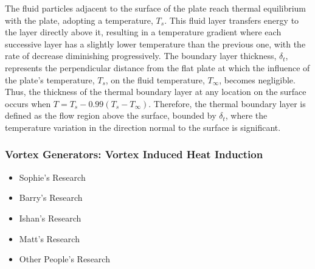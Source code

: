 The fluid particles adjacent to the surface of the plate reach thermal equilibrium with the plate, adopting a temperature, $T_s$. This fluid layer transfers energy to the layer directly above it, resulting in a temperature gradient where each successive layer has a slightly lower temperature than the previous one, with the rate of decrease diminishing progressively. The boundary layer thickness, $\delta_t$, represents the perpendicular distance from the flat plate at which the influence of the plate's temperature, $T_s$, on the fluid temperature, $T_\infty$, becomes negligible. Thus, the thickness of the thermal boundary layer at any location on the surface occurs when $T = T_s-0.99(T_s-T_\infty)$. Therefore, the thermal boundary layer is defined as the flow region above the surface, bounded by $\delta_t$, where the temperature variation in the direction normal to the surface is significant.\vspace{0.5em}







\subsubsection{Vortex Generators: Vortex Induced Heat Induction} %
\begin{itemize}
    \item Sophie's Research
    \item Barry's Research
    \item Ishan's Research
    \item Matt's Research
    \item Other People's Research
\end{itemize}

